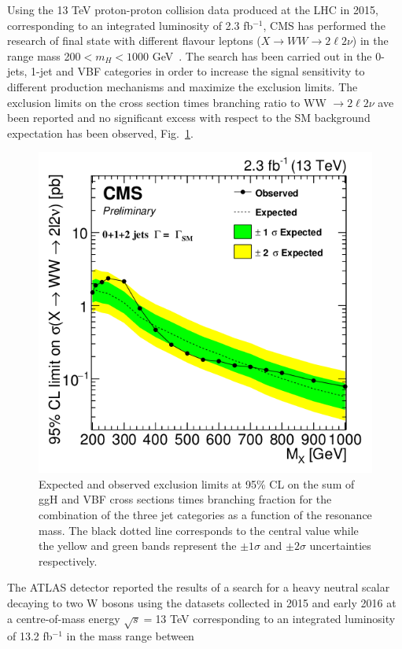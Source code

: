Using the 13 TeV proton-proton collision data produced at the LHC in 2015, corresponding to an integrated luminosity
of 2.3 fb$^{-1}$, CMS has  performed the research of final state with different flavour leptons ($X \to WW \to 2\ell 2\nu$) in the range mass 200$< m_H< 1000$ GeV~\cite{CMS-PAS-HIG-16-023}. The search has been carried out in the 0-jets, 1-jet and VBF categories in order to increase the signal sensitivity to different production mechanisms and maximize the exclusion limits. The exclusion limits on the cross section times branching ratio to  WW $\to 2\ell 2\nu$ ave been reported and no significant excess with respect to the SM background expectation has been observed, Fig.~\ref{lim_2015}.
\begin{figure}
\centering
\includegraphics[scale= 0.4]{../Cap1/lim_2015}
\caption{Expected and observed exclusion limits at 95\% CL on the sum of ggH and VBF cross
sections times branching fraction for the combination of the three jet categories as a function
of the resonance mass. The black dotted line corresponds to the central value while the yellow
and green bands represent the $\pm 1\sigma$ and $\pm 2\sigma$  uncertainties respectively. }
\label{lim_2015}
\end{figure}
The ATLAS detector reported the results of a search for a heavy neutral scalar decaying to two W bosons using the datasets collected in 2015 and early
2016 at a centre-of-mass energy $\sqrt{s}=$13 TeV corresponding to an integrated luminosity of 13.2 fb$^{-1}$ in the mass range between
